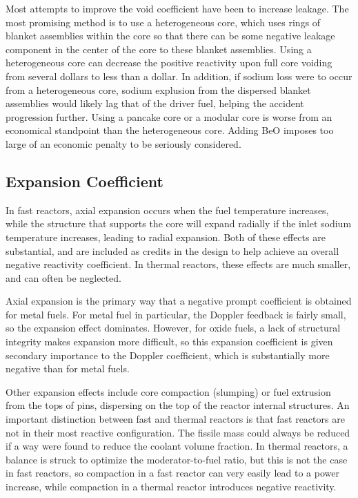\documentclass[10pt]{article}
\begin{document}
\begin{flushleft}
Most attempts to improve the void coefficient have been to increase leakage. The most promising method is to use a heterogeneous core, which uses rings of blanket assemblies within the core so that there can be some negative leakage component in the center of the core to these blanket assemblies. Using a heterogeneous core can decrease the positive reactivity upon full core voiding from several dollars to less than a dollar. In addition, if sodium loss were to occur from a heterogeneous core, sodium explusion from the dispersed blanket assemblies would likely lag that of the driver fuel, helping the accident progression further. Using a pancake core or a modular core is worse from an economical standpoint than the heterogeneous core. Adding BeO imposes too large of an economic penalty to be seriously considered.

\subsection{Expansion Coefficient}

In fast reactors, axial expansion occurs when the fuel temperature increases, while the structure that supports the core will expand radially if the inlet sodium temperature increases, leading to radial expansion. Both of these effects are substantial, and are included as credits in the design to help achieve an overall negative reactivity coefficient. In thermal reactors, these effects are much smaller, and can often be neglected. 

Axial expansion is the primary way that a negative prompt coefficient is obtained for metal fuels. For metal fuel in particular, the Doppler feedback is fairly small, so the expansion effect dominates. However, for oxide fuels, a lack of structural integrity makes expansion more difficult, so this expansion coefficient is given secondary importance to the Doppler coefficient, which is substantially more negative than for metal fuels.

Other expansion effects include core compaction (slumping) or fuel extrusion from the tops of pins, dispersing on the top of the reactor internal structures. An important distinction between fast and thermal reactors is that fast reactors are not in their most reactive configuration. The fissile mass could always be reduced if a way were found to reduce the coolant volume fraction. In thermal reactors, a balance is struck to optimize the moderator-to-fuel ratio, but this is not the case in fast reactors, so compaction in a fast reactor can very easily lead to a power increase, while compaction in a thermal reactor introduces negative reactivity.


\end{flushleft}
\end{document}
